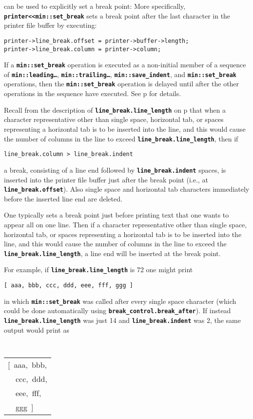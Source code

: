 \documentclass[12pt]{article}
\newcommand{\TT}[1]{{\tt \bfseries #1}}
\newcommand{\pagref}[1]{p\pageref{#1}}
\newcommand{\EOL}{\penalty \exhyphenpenalty}
\newenvironment{indpar}[1][0.3in]%
	{\begin{list}{}%
		     {\setlength{\itemsep}{0in}%
		      \setlength{\topsep}{0in}%
		      \setlength{\parsep}{1ex}%
		      \setlength{\labelwidth}{#1}%
		      \setlength{\leftmargin}{#1}%
		      \addtolength{\leftmargin}{\labelsep}}%
	 \item}%
	{\end{list}}
\begin{document}
can be used to explicitly set a break point:
More specifically, \TT{printer<{}<min::set\_\EOL break} sets a break point after
the last character in the printer file buffer by executing:
\begin{indpar}\begin{verbatim}
printer->line_break.offset = printer->buffer->length;
printer->line_break.column = printer->column;
\end{verbatim}\end{indpar}

If a \TT{min::set\_break} operation is executed as a non-initial
member of a sequence of
\TT{min::\EOL leading\ldots},
\TT{min::\EOL trailing\ldots},
\TT{min::\EOL save\_\EOL indent},
and \TT{min::\EOL set\_\EOL break} operations, then the
\TT{min::\EOL set\_\EOL break} operation is delayed until
after the other operations in the sequence have executed.  See
\pagref{LEADING-TRAILING-SET-BREAK} for details.

Recall from the description of \TT{line\_\EOL break.line\_\EOL length} on
\pagref{LINE-LENGTH}
that when a character representative other than single space, horizontal
tab, or spaces representing a horizontal tab
is to be inserted into the line, and this would cause the number
of columns in the line to exceed \TT{line\_\EOL break.line\_\EOL length},
then if
\begin{center}
\tt line\_break.column > line\_break.indent
\end{center}
a break, consisting of a line end followed by \TT{line\_\EOL break.indent}
spaces,
is inserted into the printer file buffer just after the break point
(i.e., at \TT{line\_\EOL break.offset}).  Also
single space and horizontal tab
characters immediately before the inserted line end are deleted.

One typically sets a break point just before printing text that one wants
to appear all on one line.  Then if
a character representative other than single space, horizontal
tab, or spaces representing a horizontal tab
is to be inserted into the line, and this would cause the number
of columns in the line to exceed the \TT{line\_\EOL break.line\_\EOL length},
a line end will be inserted at the break point.

For example, if \TT{line\_\EOL break.line\_\EOL length} is 72 one might
print
\begin{center}
\tt [ aaa, bbb, ccc, ddd, eee, fff, ggg ]
\end{center}
in which \TT{min::\EOL set\_\EOL break} was called after every single space
character (which could be done automatically using
\TT{break\_\EOL control.break\_\EOL after}).
If instead \TT{line\_\EOL break.line\_\EOL length}
was just 14 and \TT{line\_\EOL break.indent} was 2,
the same output would
print as
\begin{center}
\tt
\begin{tabular}{l}
[~aaa,~bbb, \\
~~ccc,~ddd, \\
~~eee,~fff, \\
~~ggg~] \\
\end{tabular}
\end{center}
\end{document}
